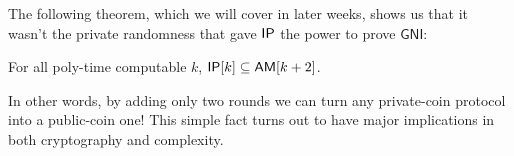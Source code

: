 \documentclass{article}
\begin{document}
The following theorem, which we will cover in later weeks, shows us that it wasn't the private randomness that gave $\mathsf{IP}$ the power to prove $\textsf{GNI}$:

\begin{theorem} \textnormal{\cite{gs86}}
    For all poly-time computable $k$,
    $\mathsf{IP}[k] \subseteq \mathsf{AM}[k + 2]$.
\end{theorem}

In other words, by adding only two rounds we can turn any private-coin protocol into a public-coin one!
This simple fact turns out to have major implications in both cryptography and complexity. 



\end{document}
